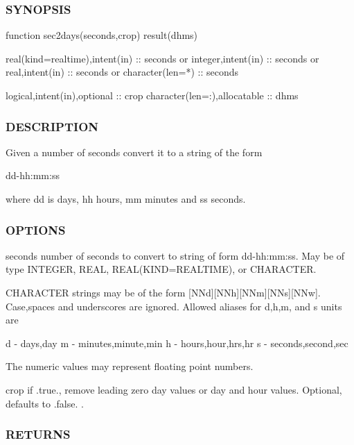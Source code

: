 \subsubsection*{S\+Y\+N\+O\+P\+S\+IS}

\begin{DoxyVerb}function sec2days(seconds,crop) result(dhms)

 real(kind=realtime),intent(in) :: seconds
   or
 integer,intent(in)             :: seconds
   or
 real,intent(in)                :: seconds
   or
 character(len=*)               :: seconds

 logical,intent(in),optional    :: crop
 character(len=:),allocatable   :: dhms
\end{DoxyVerb}


\subsubsection*{D\+E\+S\+C\+R\+I\+P\+T\+I\+ON}

Given a number of seconds convert it to a string of the form

dd-\/hh\+:mm\+:ss

where dd is days, hh hours, mm minutes and ss seconds.

\subsubsection*{O\+P\+T\+I\+O\+NS}

seconds number of seconds to convert to string of form dd-\/hh\+:mm\+:ss. May be of type I\+N\+T\+E\+G\+ER, R\+E\+AL, R\+E\+AL(K\+I\+ND=R\+E\+A\+L\+T\+I\+ME), or C\+H\+A\+R\+A\+C\+T\+ER.

C\+H\+A\+R\+A\+C\+T\+ER strings may be of the form \mbox{[}N\+Nd\mbox{]}\mbox{[}N\+Nh\mbox{]}\mbox{[}N\+Nm\mbox{]}\mbox{[}N\+Ns\mbox{]}\mbox{[}N\+Nw\mbox{]}. Case,spaces and underscores are ignored. Allowed aliases for d,h,m, and s units are \begin{DoxyVerb}d -  days,day
m -  minutes,minute,min
h -  hours,hour,hrs,hr
s -  seconds,second,sec
\end{DoxyVerb}


The numeric values may represent floating point numbers.

crop if .true., remove leading zero day values or day and hour values. Optional, defaults to .false. . \subsubsection*{R\+E\+T\+U\+R\+NS}

